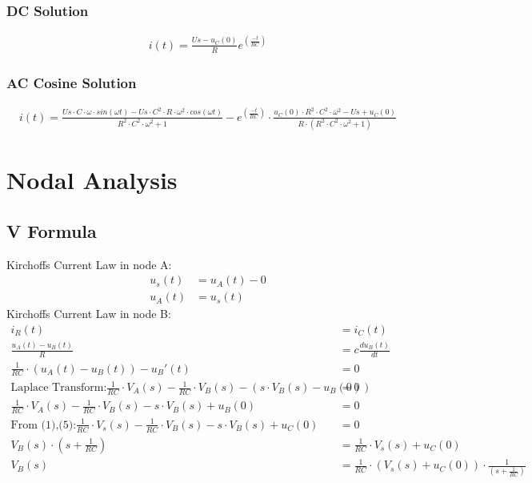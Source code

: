 \documentclass{article}
\begin{document}
\subsubsection{DC Solution}
\begin{align*}
   i(t) = \frac{Us-u_C(0)}{R} e^(\frac{-t}{RC})
\end{align*}
\subsubsection{AC Cosine Solution}
\begin{align*}
   i(t) = \frac{Us\cdot C\cdot \omega \cdot sin(\omega t)-Us\cdot C^2\cdot R \cdot \omega^2 \cdot cos(\omega t)}{R^2\cdot C^2 \cdot \omega ^2 +1}-e^(\frac{-t}{RC})\cdot\frac{u_C(0)\cdot R^2\cdot C^2 \cdot \omega ^2-Us+u_C(0)}{R\cdot (R^2\cdot C^2 \cdot \omega ^2 +1)}
\end{align*}
\section{Nodal Analysis}
\subsection{V Formula}
Kirchoffs Current Law in node A:
\begin{align}
       u_s(t) &= u_A(t) - 0 \nonumber \\
       u_A(t) &= u_s(t)     \label{eq2}
\end{align}
Kirchoffs Current Law in node B:
\begin{align*}
    i_R(t)&=i_C(t) \\
    \frac{u_A(t)-u_B(t)}{R} &= c \frac{du_B(t)}{dt}\\  
    \frac{1}{RC}\cdot (u_A(t)-u_B(t)) - u_B'(t)&=0\\
    \text{Laplace Transform:} \frac{1}{RC}\cdot V_A(s) - \frac{1}{RC}\cdot V_B(s) -(s\cdot V_B(s) -u_B(0)) &= 0\\
    \frac{1}{RC}\cdot V_A(s) - \frac{1}{RC}\cdot V_B(s) -s\cdot V_B(s) +u_B(0) &= 0\\
    \text{From (1),(5):}
    \frac{1}{RC}\cdot V_s(s) - \frac{1}{RC}\cdot V_B(s) -s\cdot V_B(s) +u_C(0) &= 0\\
    V_B(s)\cdot(s+\frac{1}{RC}) &= \frac{1}{RC}\cdot V_s(s) + u_C(0)\\
    V_B(s) &= \frac{1}{RC}\cdot (V_s(s) + u_C(0))\cdot \frac{1}{(s+\frac{1}{RC})}
\end{align*}
\end{document}
